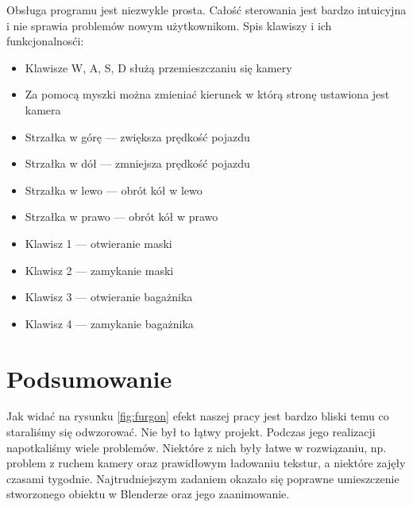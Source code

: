 \documentclass[a4paper,12pt]{article}
\numberwithin{equation}{section}
\begin{document}
Obsługa programu jest niezwykle prosta. Całość sterowania jest bardzo intuicyjna i nie sprawia problemów nowym użytkownikom. 
\newline
\noindent Spis klawiszy i ich funkcjonalnosći:
\begin{itemize}
    \item Klawisze W, A, S, D służą przemieszczaniu się kamery
    \item Za pomocą myszki można zmieniać kierunek w którą stronę ustawiona jest kamera
    \item Strzałka w górę — zwiększa prędkość pojazdu
    \item Strzałka w dół — zmniejsza prędkość pojazdu
    \item Strzałka w lewo — obrót kół w lewo
    \item Strzałka w prawo — obrót kół w prawo
    \item Klawisz 1 — otwieranie maski
    \item Klawisz 2 — zamykanie maski
    \item Klawisz 3 — otwieranie bagażnika
    \item Klawisz 4 — zamykanie bagażnika
\end{itemize}
\section{Podsumowanie}

Jak widać na rysunku \ref{fig:furgon} efekt naszej pracy jest bardzo bliski temu co staraliśmy się odwzorować. Nie był to łątwy projekt. Podczas jego realizacji napotkaliśmy wiele problemów. Niektóre z nich były łatwe w rozwiązaniu, np. problem z ruchem kamery oraz prawidłowym ładowaniu tekstur, a niektóre zajęły czasami tygodnie. Najtrudniejszym zadaniem okazało się poprawne umieszczenie stworzonego obiektu w Blenderze oraz jego zaanimowanie.
\end{document}
